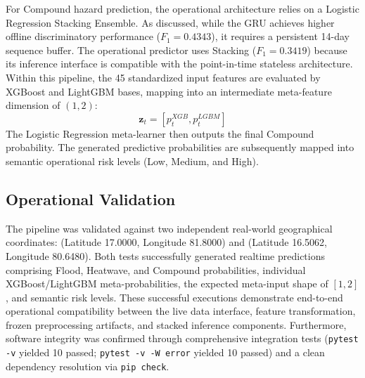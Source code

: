 For Compound hazard prediction, the operational architecture relies on a Logistic Regression Stacking Ensemble. As discussed, while the GRU achieves higher offline discriminatory performance ($F_1 = 0.4343$), it requires a persistent 14-day sequence buffer. The operational predictor uses Stacking ($F_1 = 0.3419$) because its inference interface is compatible with the point-in-time stateless architecture. Within this pipeline, the 45 standardized input features are evaluated by XGBoost and LightGBM bases, mapping into an intermediate meta-feature dimension of $(1, 2)$:
\begin{equation}
\mathbf{z}_t = \left[ p_t^{XGB}, p_t^{LGBM} \right]
\end{equation}
The Logistic Regression meta-learner then outputs the final Compound probability. The generated predictive probabilities are subsequently mapped into semantic operational risk levels (Low, Medium, and High).

\subsection{Operational Validation}
The pipeline was validated against two independent real-world geographical coordinates: (Latitude 17.0000, Longitude 81.8000) and (Latitude 16.5062, Longitude 80.6480). Both tests successfully generated realtime predictions comprising Flood, Heatwave, and Compound probabilities, individual XGBoost/LightGBM meta-probabilities, the expected meta-input shape of $[1, 2]$, and semantic risk levels. These successful executions demonstrate end-to-end operational compatibility between the live data interface, feature transformation, frozen preprocessing artifacts, and stacked inference components. Furthermore, software integrity was confirmed through comprehensive integration tests (\texttt{pytest -v} yielded 10 passed; \texttt{pytest -v -W error} yielded 10 passed) and a clean dependency resolution via \texttt{pip check}.
